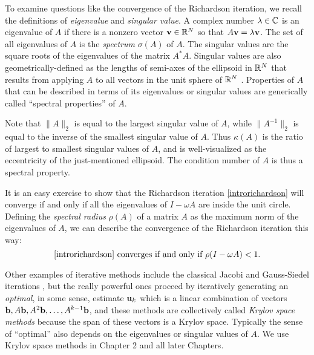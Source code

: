 To examine questions like the convergence of the Richardson iteration, we recall the definitions of \emph{eigenvalue} and \emph{singular value}.  A complex number $\lambda \in \mathbb{C}$ is an eigenvalue of $A$ if there is a nonzero vector $\mathbf{v}\in\mathbb{R}^N$ so that $A \mathbf{v} = \lambda \mathbf{v}$.  The set of all eigenvalues of $A$ is the \emph{spectrum} $\sigma(A)$ of $A$.  The singular values are the square roots of the eigenvalues of the matrix $A^*A$.  Singular values are also geometrically-defined as the lengths of semi-axes of the ellipsoid in $\mathbb{R}^N$ that results from applying $A$ to all vectors in the unit sphere of $\mathbb{R}^N$ \citep{TrefethenBau}.  Properties of $A$ that can be described in terms of its eigenvalues or singular values are generically called ``spectral properties'' of $A$.

Note that $\|A\|_2$ is equal to the largest singular value of $A$, while $\|A^{-1}\|_2$ is equal to the inverse of the smallest singular value of $A$.  Thus $\kappa(A)$ is the ratio of largest to smallest singular values of $A$, and is well-visualized as the eccentricity of the just-mentioned ellipsoid.  The condition number of $A$ is thus a spectral property.

It is an easy exercise to show that the Richardson iteration \eqref{introrichardson} will converge if and only if all the eigenvalues of $I-\omega A$ are inside the unit circle.  Defining the \emph{spectral radius} $\rho(A)$ of a matrix $A$ as the maximum norm of the eigenvalues of $A$, we can describe the convergence of the Richardson iteration this way:
\begin{equation}
\text{\eqref{introrichardson} converges if and only if } \rho(I-\omega A) < 1. \label{introconvergethm}
\end{equation}

Other examples of iterative methods include the classical Jacobi and Gauss-Siedel iterations \citep{Greenbaum1997}, but the really powerful ones proceed by iteratively generating an \emph{optimal}, in some sense, estimate $\mathbf{u}_k$ which is a linear combination of vectors $\mathbf{b},A\mathbf{b},A^2\mathbf{b},\dots,A^{k-1}\mathbf{b}$, and these methods are collectively called \emph{Krylov space methods} because the span of these vectors is a Krylov space.  Typically the sense of ``optimal'' also depends on the eigenvalues or singular values of $A$.  We use Krylov space methods in Chapter 2 and all later Chapters.

